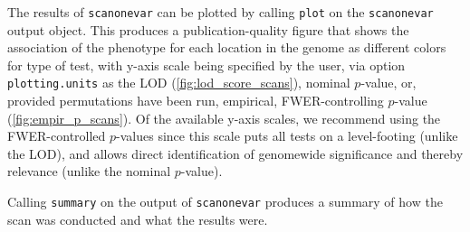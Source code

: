 \documentclass[9pt,twocolumn,twoside]{gsag3jnl}
\begin{document}
The results of \texttt{scanonevar} can be plotted by calling \texttt{plot} on the \texttt{scanonevar} output object. This produces a publication-quality figure that shows the association of the phenotype for each location in the genome as different colors for type of test, with y-axis scale being specified by the user, via option \texttt{plotting.units} as the LOD (\autoref{fig:lod_score_scans}), nominal $p$-value, or, provided permutations have been run, empirical, FWER-controlling $p$-value (\autoref{fig:empir_p_scans}). Of the available y-axis scales, we recommend using the FWER-controlled $p$-values since this scale puts all tests on a level-footing (unlike the LOD), and allows direct identification of genomewide significance and thereby relevance (unlike the nominal $p$-value).

Calling \texttt{summary} on the output of \texttt{scanonevar} produces a summary of how the scan was conducted and what the results were.





\end{document}
